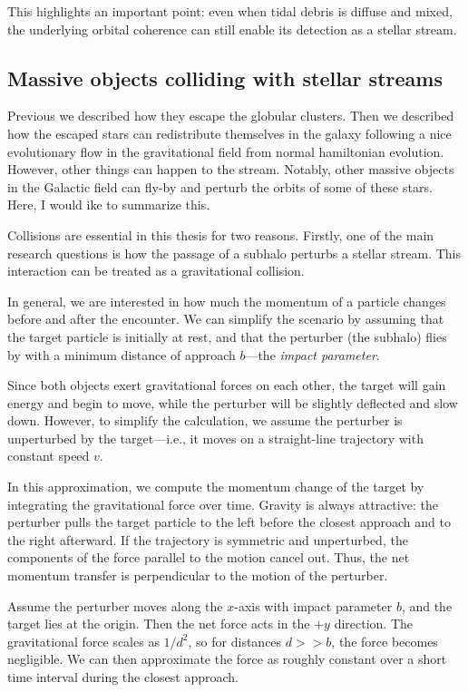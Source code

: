             This highlights an important point: even when tidal debris is diffuse and mixed, the underlying orbital coherence can still enable its detection as a stellar stream.
      
    \subsection{Massive objects colliding with stellar streams}
        Previous we described how they escape the globular clusters. Then we described how the escaped stars can redistribute themselves in the galaxy following a nice evolutionary flow in the gravitational field from normal hamiltonian evolution. However, other things can happen to the stream. Notably, other massive objects in the Galactic field can fly-by and perturb the orbits of some of these stars. Here, I would ike to summarize this. 

        Collisions are essential in this thesis for two reasons. Firstly, one of the main research questions is how the passage of a subhalo perturbs a stellar stream. This interaction can be treated as a gravitational collision.

        In general, we are interested in how much the momentum of a particle changes before and after the encounter. We can simplify the scenario by assuming that the target particle is initially at rest, and that the perturber (the subhalo) flies by with a minimum distance of approach $b$—the \emph{impact parameter}.

        Since both objects exert gravitational forces on each other, the target will gain energy and begin to move, while the perturber will be slightly deflected and slow down. However, to simplify the calculation, we assume the perturber is unperturbed by the target—i.e., it moves on a straight-line trajectory with constant speed $v$.

        In this approximation, we compute the momentum change of the target by integrating the gravitational force over time. Gravity is always attractive: the perturber pulls the target particle to the left before the closest approach and to the right afterward. If the trajectory is symmetric and unperturbed, the components of the force parallel to the motion cancel out. Thus, the net momentum transfer is perpendicular to the motion of the perturber.

        Assume the perturber moves along the $x$-axis with impact parameter $b$, and the target lies at the origin. Then the net force acts in the $+y$ direction. The gravitational force scales as $1/d^2$, so for distances $d >> b$, the force becomes negligible. We can then approximate the force as roughly constant over a short time interval during the closest approach.


